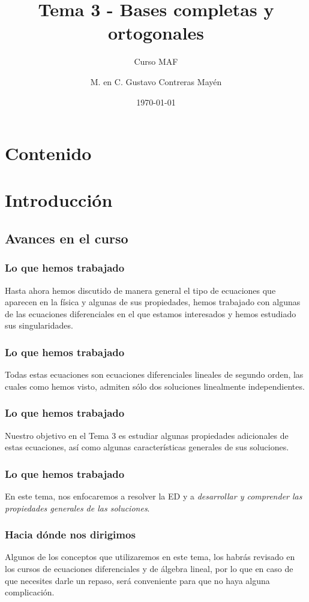 \documentclass[12pt]{beamer}
\date{\today}
\title{\large{Tema 3 - Bases completas y ortogonales}}
\subtitle{Curso MAF}
\author{M. en C. Gustavo Contreras Mayén}
\numberwithin{equation}{section}
\begin{document}
\maketitle
\fontsize{14}{14}\selectfont
{}

\section*{Contenido}

\section{Introducción}
\subsection{Avances en el curso}

\begin{frame}
\frametitle{Lo que hemos trabajado}
Hasta ahora hemos discutido de manera general el tipo de ecuaciones que aparecen en la física y algunas de sus propiedades, hemos trabajado con algunas de las ecuaciones diferenciales en el que estamos interesados y hemos estudiado sus singularidades.
\end{frame}
\begin{frame}
\frametitle{Lo que hemos trabajado}
Todas estas ecuaciones son ecuaciones diferenciales lineales de segundo orden, las cuales como hemos visto, admiten sólo dos soluciones linealmente independientes.
\end{frame}
\begin{frame}
\frametitle{Lo que hemos trabajado}
Nuestro objetivo en el Tema 3 es estudiar algunas propiedades adicionales de estas ecuaciones, así como algunas características generales de sus soluciones. 
\end{frame}
\begin{frame}
\frametitle{Lo que hemos trabajado}
En este tema, nos enfocaremos a resolver la ED y a \emph{desarrollar y comprender las propiedades generales de las soluciones}.
\end{frame}
\begin{frame}
\frametitle{Hacia dónde nos dirigimos}
Algunos de los conceptos que utilizaremos en este tema, los habrás revisado en los cursos de ecuaciones diferenciales y de álgebra lineal, por lo que en caso de que necesites darle un repaso, será conveniente para que no haya alguna complicación.
\end{frame}
\end{document}
